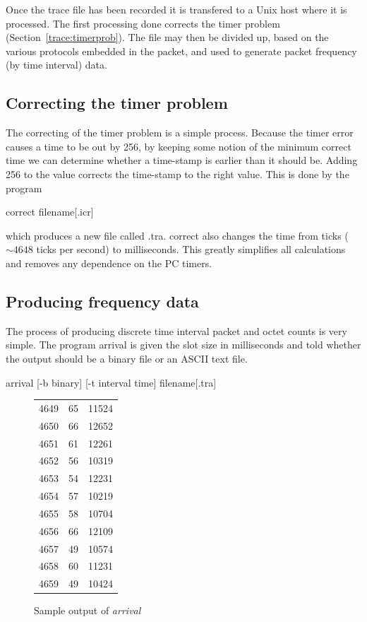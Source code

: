 Once the trace file has been recorded it is transfered to a Unix host
where it is processed.  The first processing done corrects the timer
problem (Section~\ref{trace:timerprob}).  The file may then be divided
up, based on the various protocols embedded in the packet, and used to
generate packet frequency (by time interval) data.

\subsection{Correcting the timer problem}

The correcting of the timer problem is a simple process.  Because the
timer error causes a time to be out by 256, by keeping some notion of
the minimum correct time we can determine whether a time-stamp is
earlier than it should be.  Adding 256 to the value corrects the
time-stamp to the right value.  This is done by the program

{\ttfamily \small \begin{flushleft}
  correct filename[.icr]
\end{flushleft}}
which produces a new file called {.tra}.  {\ttfamily
correct} also changes the time from ticks ($\sim 4648$ ticks per
second) to milliseconds.  This greatly simplifies all calculations and
removes any dependence on the PC timers.

\subsection{Producing frequency data}

The process of producing discrete time interval packet and octet
counts is very simple.  The program {\ttfamily arrival} is given the slot
size in milliseconds and told whether the output should be a binary
file or an ASCII text file.

{\ttfamily \small \begin{flushleft}
  arrival [-b binary] [-t interval time] filename[.tra]
\end{flushleft}}

\begin{figure}[t]
\begin{center}
{\ttfamily
\begin{tabular}{ccc}
4649	& 65	& 11524 \\
4650	& 66	& 12652 \\
4651	& 61	& 12261 \\
4652	& 56	& 10319 \\
4653	& 54	& 12231 \\
4654	& 57	& 10219 \\
4655	& 58	& 10704 \\
4656	& 66	& 12109 \\
4657	& 49	& 10574 \\
4658	& 60	& 11231 \\
4659	& 49	& 10424 \\
\end{tabular}}
\end{center}
\caption{Sample output of {\em arrival}}
\label{interval:figure1}
\end{figure}

